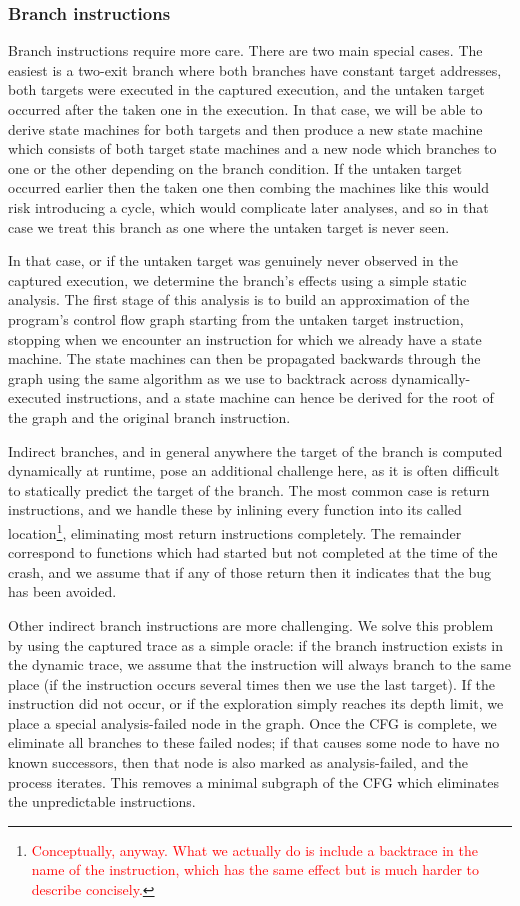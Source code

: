 \documentclass[10pt,twocolumn,preprint,natbib,authoryear]{sigplanconf}
\newcommand{\editorial}[1]{\textcolor{red}{\footnote{\textcolor{red}{#1}}}}
\begin{document}
\subsubsection{Branch instructions}
\label{sect:branch_instrs}
Branch instructions require more care.  There are two main special
cases.  The easiest is a two-exit branch where both branches have
constant target addresses, both targets were executed in the captured
execution, and the untaken target occurred after the taken one in the
execution.  In that case, we will be able to derive state machines for
both targets and then produce a new state machine which consists of
both target state machines and a new node which branches to one or the
other depending on the branch condition.  If the untaken target
occurred earlier then the taken one then combing the machines like
this would risk introducing a cycle, which would complicate later
analyses, and so in that case we treat this branch as one where the
untaken target is never seen.

In that case, or if the untaken target was genuinely never observed in
the captured execution, we determine the branch's effects using a
simple static analysis.  The first stage of this analysis is to build
an approximation of the program's control flow graph starting from the
untaken target instruction, stopping when we encounter an instruction
for which we already have a state machine.  The state machines can
then be propagated backwards through the graph using the same
algorithm as we use to backtrack across dynamically-executed
instructions, and a state machine can hence be derived for the root of
the graph and the original branch instruction.

Indirect branches, and in general anywhere the target of the branch is
computed dynamically at runtime, pose an additional challenge here, as
it is often difficult to statically predict the target of the branch.
The most common case is return instructions, and we handle these by
inlining every function into its called
location\editorial{Conceptually, anyway.  What we actually do is
  include a backtrace in the name of the instruction, which has the
  same effect but is much harder to describe concisely.}, eliminating
most return instructions completely.  The remainder correspond to
functions which had started but not completed at the time of the
crash, and we assume that if any of those return then it indicates
that the bug has been avoided.

Other indirect branch instructions are more challenging.  We solve
this problem by using the captured trace as a simple oracle: if the
branch instruction exists in the dynamic trace, we assume that the
instruction will always branch to the same place (if the instruction
occurs several times then we use the last target).  If the instruction
did not occur, or if the exploration simply reaches its depth limit,
we place a special analysis-failed node in the graph.  Once the CFG is
complete, we eliminate all branches to these failed nodes; if that
causes some node to have no known successors, then that node is also
marked as analysis-failed, and the process iterates.  This removes a
minimal subgraph of the CFG which eliminates the unpredictable
instructions.
\end{document}
